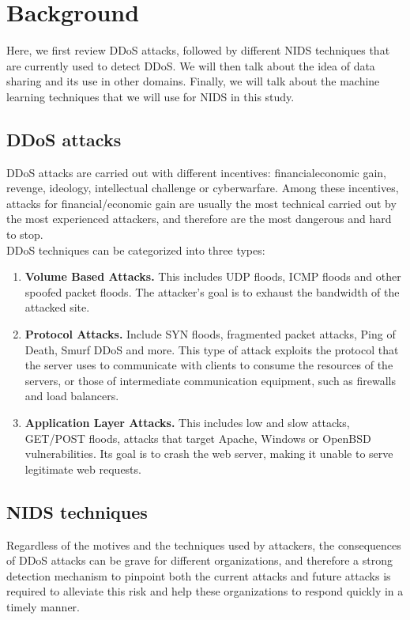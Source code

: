 \section{Background}
\label{sec:background}
\begin{background}
Here, we first review DDoS attacks, followed by different NIDS techniques that are currently used to detect DDoS. We will then talk about the idea of data sharing and its use in other domains. Finally, we will talk about the machine learning techniques that we will use for NIDS in this study.
\subsection{DDoS attacks}
DDoS attacks are carried out with different incentives: financial\/economic gain, revenge, ideology, intellectual challenge or cyberwarfare. Among these incentives, attacks for financial/economic gain are usually the most technical carried out by the most experienced attackers, and therefore are the most dangerous and hard to stop.\\
DDoS techniques can be categorized into three types:
\begin{enumerate}
    \item \textbf{Volume Based Attacks.} This includes UDP floods, ICMP floods and other spoofed packet floods. The attacker's goal is to exhaust the bandwidth of the attacked site.
    \item \textbf{Protocol Attacks.} Include SYN floods, fragmented packet attacks, Ping of Death, Smurf DDoS and more. This type of attack exploits the protocol that the server uses to communicate with clients to consume the resources of the servers, or those of intermediate communication equipment, such as firewalls and load balancers.
    \item \textbf{Application Layer Attacks.} This includes low and slow attacks, GET/POST floods, attacks that target Apache, Windows or OpenBSD vulnerabilities. Its goal is to crash the web server, making it unable to serve legitimate web requests.
\end{enumerate}


\subsection{NIDS techniques}
Regardless of the motives and the techniques used by attackers, the consequences of DDoS attacks can be grave for different organizations, and therefore a strong detection mechanism to pinpoint both the current attacks and future attacks is required to alleviate this risk and help these organizations to respond quickly in a timely manner. 


\end{background}
